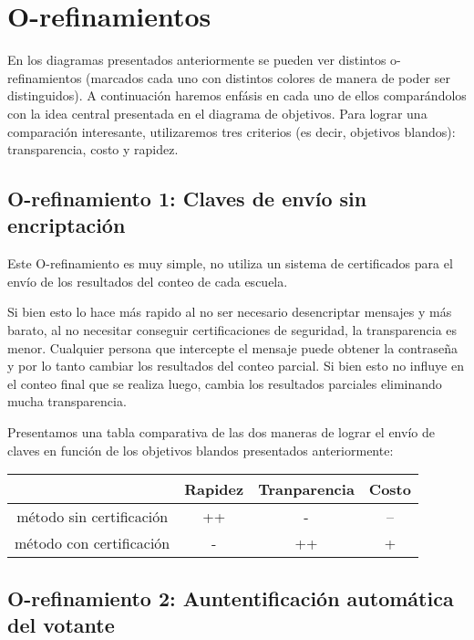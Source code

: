\section{O-refinamientos}

En los diagramas presentados anteriormente se pueden ver distintos o-refinamientos (marcados cada uno con distintos colores de manera de poder ser distinguidos). A continuación haremos enfásis en cada uno de ellos compar\'andolos con la idea central presentada en el diagrama de objetivos. Para lograr una comparación interesante, utilizaremos tres criterios (es decir, objetivos blandos): transparencia, costo y rapidez.

\subsection{O-refinamiento 1: Claves de env\'io sin encriptación}

Este O-refinamiento es muy simple, no utiliza un sistema de certificados para el env\'io de los resultados del conteo de cada escuela.

Si bien esto lo hace más rapido al no ser necesario desencriptar mensajes y más barato, al no necesitar conseguir certificaciones de seguridad, la transparencia es menor. Cualquier persona que intercepte el mensaje puede obtener la contraseña y por lo tanto cambiar los resultados del 
conteo parcial. Si bien esto no influye en el conteo final que se realiza luego, cambia los resultados parciales eliminando mucha transparencia.

Presentamos una tabla comparativa de las dos maneras de lograr el env\'io de claves en función de los objetivos blandos presentados anteriormente:

\begin{table}[H]
\centering
 \begin{tabular}{|c | c | c | c|} 
 \hline
 & Rapidez & Tranparencia & Costo \\
 \hline
 método sin certificación & ++ & -  & -- \\
 \hline
 método con certificación & - & ++ & + \\
 \hline
 
 \end{tabular}
\end{table}

\subsection{O-refinamiento 2: Auntentificación automática del votante}

